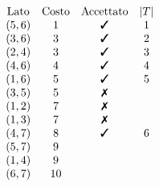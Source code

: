 \begin{figure}[htpb]
\begin{tikzpicture}[x=0.75pt,y=0.75pt,yscale=-1,xscale=1]
	\end{tikzpicture}
\end{figure}
\FloatBarrier

\begin{equation*}
\begin{array}{ c c c c }
\text{Lato} & \text{Costo} & \text{Accettato} & | T| \\
( 5,6) & 1 & \text{\cmark}  & 1\\
( 3,6) & 3 & \text{\cmark}  & 2\\
( 2,4) & 3 & \text{\cmark}  & 3\\
( 4,6) & 4 & \text{\cmark}  & 4\\
( 1,6) & 5 & \text{\cmark}  & 5\\
( 3,5) & 5 & \text{\xmark}  & \\
( 1,2) & 7 & \text{\xmark}  & \\
( 1,3) & 7 & \text{\xmark}  & \\
( 4,7) & 8 & \text{\cmark}  & 6\\
( 5,7) & 9 &  & \\
( 1,4) & 9 &  & \\
( 6,7) & 10 &  & 
\end{array}
\end{equation*}
\Es

